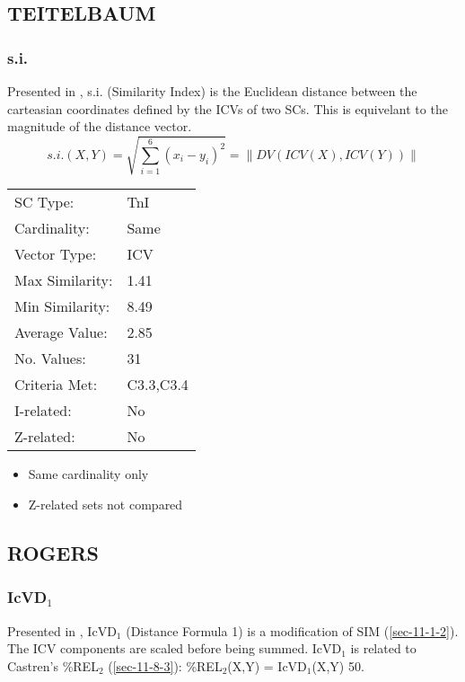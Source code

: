 \documentclass{article}
\begin{document}
\subsection{TEITELBAUM}
\label{sec-11-3}
\subsubsection{s.i.}
\label{sec-11-3-1}

Presented in \citet[pp. 88]{Teitelbaum1965}, s.i. (Similarity Index)
is the Euclidean distance between the carteasian coordinates defined
by the ICVs of two SCs. This is equivelant to the magnitude of the
distance vector.
$$s.i.(X,Y)=\sqrt{\sum_{i=1}^{6}(x_{i}-y_{i})^{2}}=\left\|DV(ICV(X),ICV(Y))\right\|$$

\begin{center}
\begin{tabular}{ll}
 SC Type:         &  TnI        \\
 Cardinality:     &  Same       \\
 Vector Type:     &  ICV        \\
 Max Similarity:  &  1.41       \\
 Min Similarity:  &  8.49       \\
 Average Value:   &  2.85       \\
 No. Values:      &  31         \\
 Criteria Met:    &  C3.3,C3.4  \\
 I-related:       &  No         \\
 Z-related:       &  No         \\
\end{tabular}
\end{center}


\begin{itemize}
\item Same cardinality only
\item Z-related sets not compared
\end{itemize}
\subsection{ROGERS}
\label{sec-11-4}
\subsubsection{IcVD$_{1}$}
\label{sec-11-4-1}

Presented in \citet{Rogers1992}, IcVD$_{1}$ (Distance Formula 1) is a
modification of SIM (\ref{sec-11-1-2}). The ICV components are scaled before being
summed. IcVD$_{1}$ is related to Castren's \%REL$_{2}$ (\ref{sec-11-8-3}):
\%REL$_{2}$(X,Y) = IcVD$_{1}$(X,Y)\texttimes{} 50.  
\end{document}
